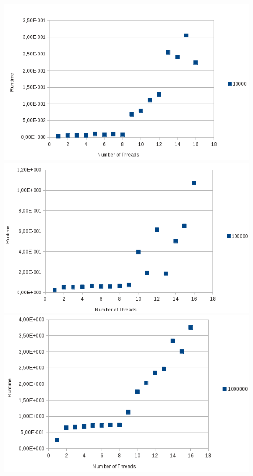 \documentclass[a4paper,10pt]{article}
\begin{document}
\begin{center}
\includegraphics{strong_scaling_10000.png}\\
\includegraphics{strong_scaling_100000.png}\\
\includegraphics{strong_scaling_1000000.png}\\

\end{center}
\end{document}
